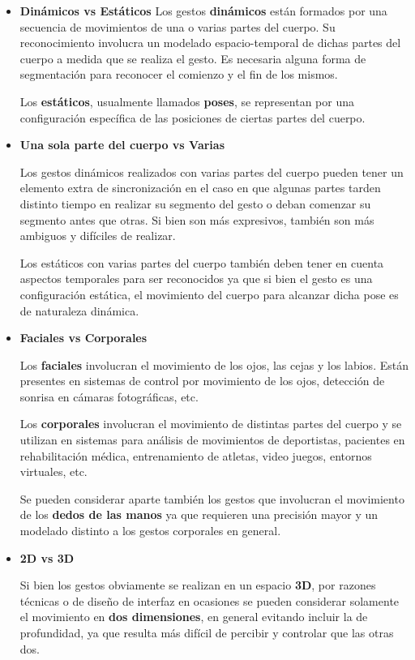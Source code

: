\newcommand{\vs}{\textbf{vs }}

\newcommand{\vsitem}[2]{ \item \textbf{#1 \vs #2} }

\begin{itemize}

\vsitem{ Dinámicos}{Estáticos}
Los gestos \textbf{dinámicos} están formados por una secuencia de movimientos de una o varias partes del cuerpo. Su reconocimiento involucra un modelado espacio-temporal de dichas partes del cuerpo a medida que se realiza el gesto. Es necesaria alguna forma de segmentación para reconocer el comienzo y el fin de los mismos.

Los \textbf{estáticos}, usualmente llamados \textbf{poses}, se representan por una configuración específica de las posiciones de ciertas partes del cuerpo. 

\vsitem{Una sola parte del cuerpo}{Varias}

Los gestos dinámicos realizados con varias partes del cuerpo pueden tener un elemento extra de sincronización en el caso en que algunas partes tarden distinto tiempo en realizar su segmento del gesto o deban comenzar su segmento antes que otras. Si bien son más expresivos, también son más ambiguos y difíciles de realizar.

Los estáticos con varias partes del cuerpo también deben tener en cuenta aspectos temporales para ser reconocidos ya que si bien el gesto es una configuración estática, el movimiento del cuerpo para alcanzar dicha pose es de naturaleza dinámica.

\vsitem{Faciales}{Corporales}

Los \textbf{faciales} involucran el movimiento de los ojos, las cejas y los labios. Están presentes en sistemas de control por movimiento de los ojos, detección de sonrisa en cámaras fotográficas, etc. 

Los \textbf{corporales} involucran el movimiento de distintas partes del cuerpo y se utilizan en sistemas para análisis de movimientos de deportistas, pacientes en rehabilitación médica, entrenamiento de atletas, video juegos, entornos virtuales, etc.

Se pueden considerar aparte también los gestos que involucran el movimiento de los \textbf{dedos de las manos} ya que requieren una precisión mayor y un modelado distinto a los gestos corporales en general.

\vsitem{2D}{3D}

Si bien los gestos obviamente se realizan en un espacio \textbf{3D}, por razones técnicas o de diseño de interfaz en ocasiones se pueden considerar solamente el movimiento en \textbf{dos dimensiones}, en general evitando incluir la de profundidad, ya que resulta más difícil de percibir y controlar que las otras dos.


\end{itemize}
